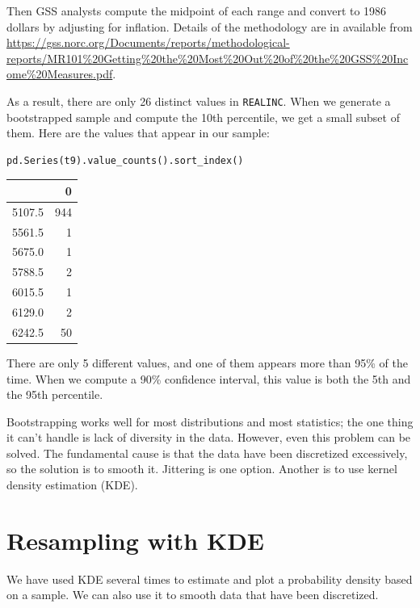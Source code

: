 Then GSS analysts compute the midpoint of each range and convert to 1986
dollars by adjusting for inflation. Details of the methodology are in
available from
\url{https://gss.norc.org/Documents/reports/methodological-reports/MR101\%20Getting\%20the\%20Most\%20Out\%20of\%20the\%20GSS\%20Income\%20Measures.pdf}.

As a result, there are only 26 distinct values in
\passthrough{\lstinline!REALINC!}. When we generate a bootstrapped
sample and compute the 10th percentile, we get a small subset of them.
Here are the values that appear in our sample:

\begin{lstlisting}[language=Python,style=source]
pd.Series(t9).value_counts().sort_index()
\end{lstlisting}

\begin{tabular}{lr}
\toprule
{} &    0 \\
\midrule
5107.5 &  944 \\
5561.5 &    1 \\
5675.0 &    1 \\
5788.5 &    2 \\
6015.5 &    1 \\
6129.0 &    2 \\
6242.5 &   50 \\
\bottomrule
\end{tabular}

There are only 5 different values, and one of them appears more than
95\% of the time. When we compute a 90\% confidence interval, this value
is both the 5th and the 95th percentile.

Bootstrapping works well for most distributions and most statistics; the
one thing it can't handle is lack of diversity in the data. However,
even this problem can be solved. The fundamental cause is that the data
have been discretized excessively, so the solution is to smooth it.
Jittering is one option. Another is to use kernel density estimation
(KDE).

\hypertarget{resampling-with-kde}{%
\section{Resampling with KDE}\label{resampling-with-kde}}

We have used KDE several times to estimate and plot a probability
density based on a sample. We can also use it to smooth data that have
been discretized.

